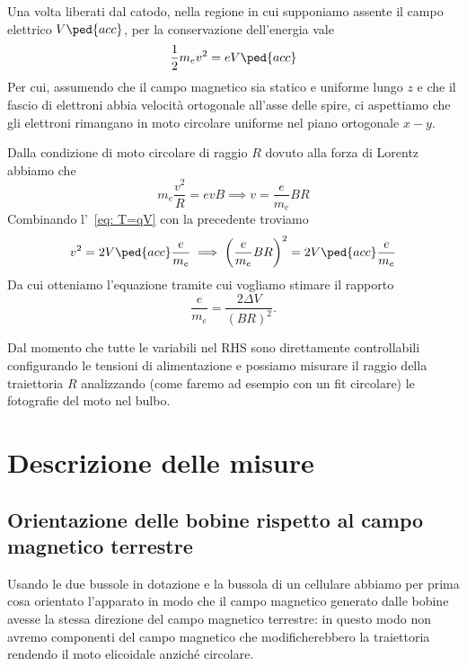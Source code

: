 \documentclass[10pt, a4paper, italian]{article}
\begin{document}
Una volta liberati dal catodo, nella regione in cui supponiamo assente il
campo elettrico $V\ped{acc}$, per la conservazione dell'energia vale
\begin{equation}\label{eq: T=qV}
    \frac{1}{2} m_{e} v^{2} = e V\ped{acc}
\end{equation}
Per cui, assumendo che il campo magnetico sia statico e uniforme lungo $z$ e
che il fascio di elettroni abbia velocità ortogonale all'asse delle spire,
ci aspettiamo che gli elettroni rimangano in moto circolare uniforme nel
piano ortogonale $x-y$.

Dalla condizione di moto circolare di raggio $R$ dovuto alla forza di Lorentz
abbiamo che
\[
m_{e} \frac{v^2}{R} = e v B \implies v = \frac{e}{m_e} B R
\]
Combinando l'~\cref{eq: T=qV} con la precedente troviamo
\[
v^2 = 2 V\ped{acc} \frac{e}{m_e} \implies \left(\frac{e}{m_e} B R\right)^2 =
2 V\ped{acc} \frac{e}{m_e}
\]
Da cui otteniamo l'equazione tramite cui vogliamo stimare il rapporto
\begin{equation}\label{eq: fit}
\frac{e}{m_{e}} = \frac{2 \Delta V}{(BR)^2}.
\end{equation}

Dal momento che tutte le variabili nel RHS sono direttamente controllabili
configurando le tensioni di alimentazione e possiamo misurare il raggio
della traiettoria $R$ analizzando (come faremo ad esempio con un fit
circolare) le fotografie del moto nel bulbo.

\section{Descrizione delle misure}
\subsection{Orientazione delle bobine rispetto al campo magnetico terrestre}
Usando le due bussole in dotazione e la bussola di un cellulare abbiamo per
prima cosa orientato l'apparato in modo che il campo magnetico generato dalle
bobine avesse la stessa direzione del campo magnetico terrestre: in questo modo non avremo componenti del campo magnetico che modificherebbero la traiettoria rendendo il moto elicoidale anziché circolare.
\end{document}
